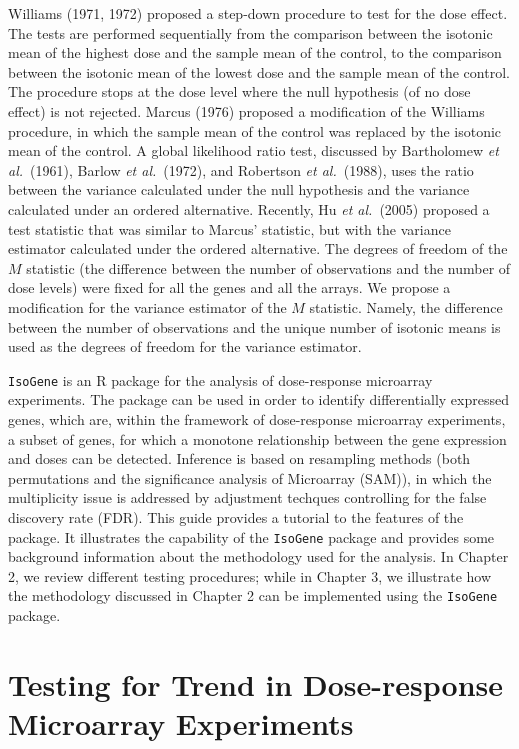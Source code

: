 \documentclass[10pt]{mybook4}
\begin{document}
Williams (1971, 1972) proposed a step-down procedure to test for the
dose effect. The tests are performed sequentially from the
comparison between the isotonic mean of the highest dose and the
sample mean of the control, to the comparison between the isotonic
mean of the lowest dose and the sample mean of the control. The
procedure stops at the dose level where the null hypothesis (of no
dose effect) is not rejected. Marcus (1976) proposed a modification
of the Williams procedure, in which the sample mean of the control
was replaced by the isotonic mean of the control. A global
likelihood ratio test, discussed by Bartholomew \textit{et al.}\
(1961), Barlow \textit{et al.}\ (1972), and Robertson \textit{et
al.}\ (1988), uses the ratio between the variance calculated under
the null hypothesis and the variance calculated under an ordered
alternative. Recently, Hu \textit{et al.}\ (2005) proposed a test
statistic that was similar to Marcus' statistic, but with the
variance estimator calculated under the ordered alternative. The
degrees of freedom of the $M$ statistic (the difference between the
number of observations and the number of dose levels) were fixed for
all the genes and all the arrays. We propose a modification for the
variance estimator of the $M$ statistic. Namely, the difference
between the number of observations and the unique number of isotonic
means is used as the degrees of freedom for the variance estimator.

\texttt{IsoGene} is an R package for the analysis of dose-response microarray experiments. 
The package can be used in order to identify differentially expressed genes, which are, 
within the framework of dose-response microarray experiments, a subset of genes, 
for which a monotone relationship between the gene expression and doses can be detected. 
Inference is based on resampling methods (both permutations and the 
significance analysis of Microarray (SAM)), in which the multiplicity issue is addressed 
by adjustment techques controlling for the false discovery rate (FDR). This guide provides 
a tutorial to the features of the package. It illustrates the capability of the \texttt{IsoGene} 
package and provides some background information about the methodology used for
the analysis. In Chapter 2, we review different testing procedures; while in Chapter 3, we 
illustrate how the methodology discussed in Chapter 2 can be implemented using the 
\texttt{IsoGene} package.


\section{Testing for Trend in Dose-response Microarray Experiments}
\end{document}
